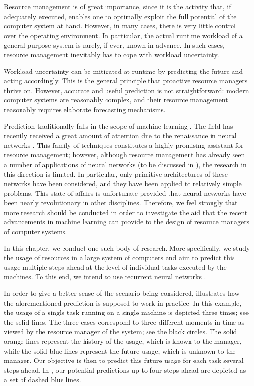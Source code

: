 Resource management is of great importance, since it is the activity that, if
adequately executed, enables one to optimally exploit the full potential of the
computer system at hand. However, in many cases, there is very little control
over the operating environment. In particular, the actual runtime workload of a
general-purpose system is rarely, if ever, known in advance. In such cases,
resource management inevitably has to cope with workload uncertainty.

Workload uncertainty can be mitigated at runtime by predicting the future and
acting accordingly. This is the general principle that proactive resource
managers thrive on. However, accurate and useful prediction is not
straightforward: modern computer systems are reasonably complex, and their
resource management reasonably requires elaborate forecasting mechanisms.

Prediction traditionally falls in the scope of machine learning
\cite{hastie2013}. The field has recently received a great amount of attention
due to the renaissance in neural networks \cite{goodfellow2016}. This family of
techniques constitutes a highly promising assistant for resource management;
however, although resource management has already seen a number of applications
of neural networks (to be discussed in ), the research in this
direction is limited. In particular, only primitive architectures of these
networks have been considered, and they have been applied to relatively simple
problems. This state of affairs is unfortunate provided that neural networks
have been nearly revolutionary in other disciplines. Therefore, we feel strongly
that more research should be conducted in order to investigate the aid that the
recent advancements in machine learning can provide to the design of resource
managers of computer systems.

In this chapter, we conduct one such body of research. More specifically, we
study the usage of resources in a large system of computers and aim to predict
this usage multiple steps ahead at the level of individual tasks executed by the
machines. To this end, we intend to use recurrent neural networks
\cite{goodfellow2016}.

In order to give a better sense of the scenario being considered,
 illustrates how the aforementioned prediction is
supposed to work in practice. In this example, the  usage of a single
task running on a single machine is depicted three times; see the solid lines.
The three cases correspond to three different moments in time as viewed by the
resource manager of the system; see the black circles. The solid orange lines
represent the history of the usage, which is known to the manager, while the
solid blue lines represent the future usage, which is unknown to the manager.
Our objective is then to predict this future usage for each task several steps
ahead. In , our potential predictions up to four steps
ahead are depicted as a set of dashed blue lines.

